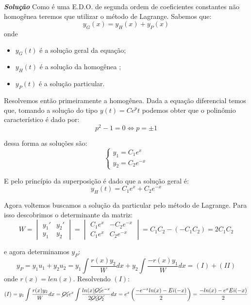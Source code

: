 \linespread{1.5}

\textit{\textbf{Solução}}
Como é uma E.D.O. de segunda ordem de coeficientes constantes não homogênea  teremos que utilizar o método de Lagrange. Sabemos que:
\begin{equation*}
    y_G(x) = y_H(x) + y_P(x)
\end{equation*}
onde 
\begin{itemize}
    \item $y_G(t)$ é a solução geral da equação;
    \item $y_H(t)$ é a solução da homogênea ;
    \item $y_P(t)$ é a solução particular.
\end{itemize}

Resolvemos então primeiramente a homogênea. Dada a equação diferencial temos que, tomando a solução do tipo $ y(t) = Ce^pt $ podemos obter que o polinômio característico é dado por:
\begin{equation*}
    p^2 - 1 = 0 \Longleftrightarrow p = \pm 1
\end{equation*}

dessa forma as soluções são:
\begin{equation*}
    \begin{cases}
    y_1 = C_1e^x\\
    y_2 = C_2e^{-x}
    \end{cases}
\end{equation*}

E pelo princípio da superposição é dado que a solução geral é:
\begin{equation*}
    y_H(t) = C_1e^x + C_2e^{-x}
\end{equation*}

Agora voltemos buscamos a solução da particular pelo método de Lagrange. Para isso descobrimos o determinante da matriz:
\begin{equation*}
    W = \begin{vmatrix} 
        y_1' & y_2'\\
        y_1  & y_2
        \end{vmatrix} = 
        \begin{vmatrix} 
        C_1e^{x} & -C_2e^{-x}\\
        C_1e^{x} &  C_2e^{-x}
        \end{vmatrix} = C_1C_2 - (-C_1C_2) = 2C_1C_2
\end{equation*}

e agora determinamos $y_P$:
\begin{equation*}
  y_P = y_1u_1 + y_2u_2 = y_1\int \frac{r(x)y_2}{W} dx + y_2\int \frac{-r(x)y_1}{W} dx = (I) + (II)
\end{equation*}
onde $r(x) = len(x)$. Resolvendo $(I)$:
\begin{equation*}
    (I) = y_1\int \frac{r(x)y_2}{W} dx = \cancel{C_1}e^x\int \frac{ln(x)\cancel{C_2}e^{-x}}{2\cancel{C_1}\cancel{C_2}} dx = e^x\left(\frac{-e^{-x}ln(x) - Ei(-x)}{2}\right) = \frac{-ln(x) - e^xEi(-x)}{2}
\end{equation*}

